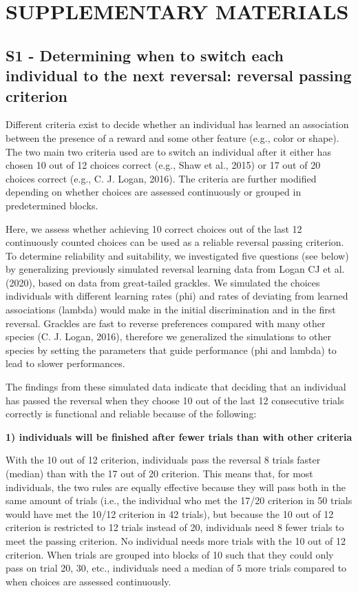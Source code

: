 \documentclass[
]{article}
\begin{document}
\section{\texorpdfstring{\textbf{SUPPLEMENTARY
MATERIALS}}{SUPPLEMENTARY MATERIALS}}\label{supplementary-materials}

\subsection{S1 - Determining when to switch each individual to the next
reversal: reversal passing
criterion}\label{s1---determining-when-to-switch-each-individual-to-the-next-reversal-reversal-passing-criterion}

Different criteria exist to decide whether an individual has learned an
association between the presence of a reward and some other feature
(e.g., color or shape). The two main two criteria used are to switch an
individual after it either has chosen 10 out of 12 choices correct
(e.g., Shaw et al., 2015) or 17 out of 20 choices correct (e.g., C. J.
Logan, 2016). The criteria are further modified depending on whether
choices are assessed continuously or grouped in predetermined blocks.

Here, we assess whether achieving 10 correct choices out of the last 12
continuously counted choices can be used as a reliable reversal passing
criterion. To determine reliability and suitability, we investigated
five questions (see below) by generalizing previously simulated reversal
learning data from Logan CJ et al. (2020), based on data from
great-tailed grackles. We simulated the choices individuals with
different learning rates (phi) and rates of deviating from learned
associations (lambda) would make in the initial discrimination and in
the first reversal. Grackles are fast to reverse preferences compared
with many other species (C. J. Logan, 2016), therefore we generalized
the simulations to other species by setting the parameters that guide
performance (phi and lambda) to lead to slower performances.

The findings from these simulated data indicate that deciding that an
individual has passed the reversal when they choose 10 out of the last
12 consecutive trials correctly is functional and reliable because of
the following:

\textbf{1) individuals will be finished after fewer trials than with
other criteria}

With the 10 out of 12 criterion, individuals pass the reversal 8 trials
faster (median) than with the 17 out of 20 criterion. This means that,
for most individuals, the two rules are equally effective because they
will pass both in the same amount of trials (i.e., the individual who
met the 17/20 criterion in 50 trials would have met the 10/12 criterion
in 42 trials), but because the 10 out of 12 criterion is restricted to
12 trials instead of 20, individuals need 8 fewer trials to meet the
passing criterion. No individual needs more trials with the 10 out of 12
criterion. When trials are grouped into blocks of 10 such that they
could only pass on trial 20, 30, etc., individuals need a median of 5
more trials compared to when choices are assessed continuously.
\end{document}
